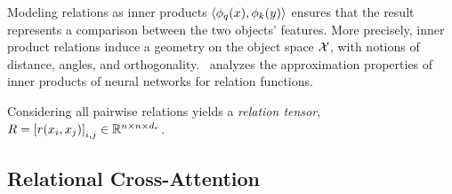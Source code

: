 
Modeling relations as inner products $\left \langle \phi_q(x), \phi_k(y) \right\rangle$ ensures that the result represents a comparison between the two objects' features. More precisely, inner product relations induce a geometry on the object space ${\mathcal{X}}$, with notions of distance, angles, and orthogonality.~\citet{altabaaApproximationRelationFunctions2024} analyzes the approximation properties of inner products of neural networks for relation functions.

Considering all pairwise relations yields a \textit{relation tensor}, $R = \left[r(x_i, x_j)\right]_{i,j} \in \mathbb{R}^{n \times n \times d_r}$.

\subsection{Relational Cross-Attention}\label{ssec:relational_crossattention}

